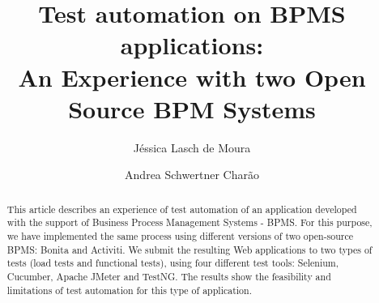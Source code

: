 \documentclass[runningheads,a4paper]{llncs}
\newcommand{\keywords}[1]{\par\addvspace\baselineskip
\noindent\keywordname\enspace\ignorespaces#1}
\begin{document}
\mainmatter  %

\title{
Test automation on BPMS applications: \\ An Experience with two Open Source BPM Systems}


%
%
\author{Jéssica Lasch de Moura
\and Andrea Schwertner Charão}
%


%
%

\maketitle


\begin{abstract}
This article describes an experience of test automation of an application developed with the support of Business Process Management Systems - BPMS. For this purpose, we have implemented the same process using different versions of two open-source BPMS: Bonita and Activiti. We submit the resulting Web applications to two types of tests (load tests and functional tests), using four different test tools: Selenium, Cucumber, Apache JMeter and TestNG. The results show the feasibility and limitations of test automation for this type of application.

\end{abstract}
\end{document}
